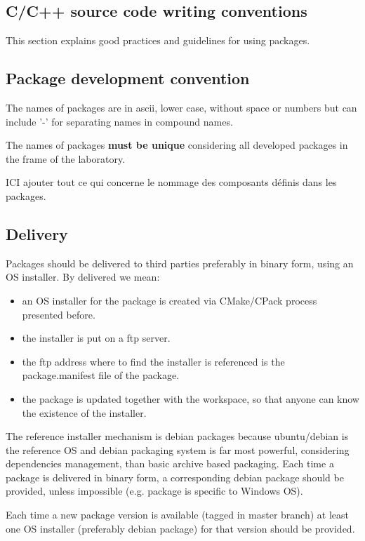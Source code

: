 \documentclass[12pt,a4paper]{article}
\begin{document}
\subsection{C/C++ source code writing conventions}

This section explains good practices and guidelines for using packages.

\subsection{Package development convention}

The names of packages are in ascii, lower case, without space or numbers but can include '-' for separating names in compound names.

The names of packages \textbf{must be unique} considering all developed packages in the frame of the laboratory.

ICI ajouter tout ce qui concerne le nommage des composants définis dans les packages.

\subsection{Delivery}

Packages should be delivered to third parties preferably in binary form, using an OS installer. By delivered we mean:
\begin{itemize}
\item an OS installer for the package is created via CMake/CPack process presented before.
\item the installer is put on a ftp server.
\item the ftp address where to find the installer is referenced is the package.manifest file of the package.
\item the package is updated together with the workspace, so that anyone can know the existence of the installer.
\end{itemize}

The reference installer mechanism is debian packages because ubuntu/debian is the reference OS and debian packaging system is far most powerful, considering dependencies management, than basic archive based packaging. Each time a package is delivered in binary form, a corresponding debian package should be provided, unless impossible (e.g. package is specific to Windows OS).

Each time a new package version is available (tagged in master branch) at least one OS installer (preferably debian package) for that version should be provided.
\end{document}
